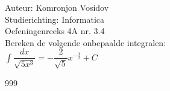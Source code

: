 \documentclass[a4paper]{article}
\newcommand{\dint}{\displaystyle\int}
\begin{document}
	
	\noindent \large Auteur: Komronjon Vosidov \\
	\noindent \large Studierichting: Informatica\\
	\noindent \large Oefeningenreeks 4A nr. 3.4\\
	
	
	\medskip
	\normalsize
	Bereken de volgende onbepaalde integralen:\\
	
	$ \dint \dfrac{dx}{\sqrt{5x^3}} = -\dfrac{2}{\sqrt{5}} x^{-\tfrac{1}{2}} + C $



	
\begin{thebibliography}{999}
\end{thebibliography}		
\end{document}
